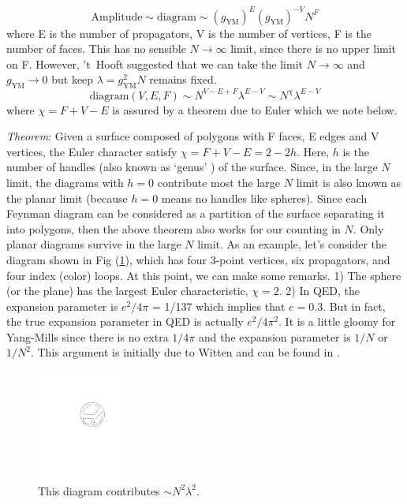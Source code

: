 \[  \text{Amplitude} \sim \text{diagram} \sim (g_{\text{YM}})^{E} (g_{\text{YM}})^{-V} N^{F} \] 
where E is the number of propagators, V is the number of vertices, F is the number of faces. This has no sensible
$N \to \infty$ limit, since there is no upper limit on F. However, 't~Hooft suggested that we can
take the limit $N \to \infty$ and $g_{\text{YM}} \to 0$ but keep $\lambda = g_{\text{YM}}^{2} N $ remains fixed. 
\[ \text{diagram}(V,E,F) \sim N^{V-E+F} \lambda^{E-V}  \sim N^{\chi} \lambda^{E-V} \] 
where $\chi = F + V - E$ is assured by a theorem due to Euler which we note below.  

\emph{Theorem}: Given a surface composed of polygons with F faces, E edges and V vertices, the Euler character satisfy
$\chi = F + V - E = 2 - 2h$. 
Here, $h$ is the number of handles (also known as `genus' ) of the surface.
Since, in the large $N$ limit, the diagrams with $h = 0$ contribute most 
the large $N$ limit is also known as the planar limit (because $h=0$ means no handles like spheres). Since each Feynman 
diagram can be considered as a partition of the surface separating it into polygons, then the
above theorem also works for our counting in $N$. Only planar diagrams survive in the large $N$ limit.  
As an example, let's consider the diagram shown in Fig (\ref{fig:dia1}), which has four 3-point vertices, six propagators, and four index (color) loops. At this point, we can make some remarks. 1)  The sphere (or the plane) has the largest 
Euler characteristic, $\chi = 2$. 
2) In QED, the expansion parameter is $e^2/4\pi$ = 
1/137 which implies that $e = 0.3$. But in fact, the true expansion parameter in QED is actually  $e^2/4\pi^2$. It is a little gloomy 
for Yang-Mills since there is no
extra $1/4\pi$ and the expansion parameter is $1/N$ or $1/N^2$. This argument is initially due to Witten and can be found in 
\cite{SCA}. 

\begin{figure}
 \label{fig:dia1}
\begin{center}\includegraphics[width=0.25\textwidth]{./Figures/DL5}\end{center}
\caption{\label{fig:dia1}This diagram contributes $\sim N^2 \lambda^2$.}
\end{figure}

